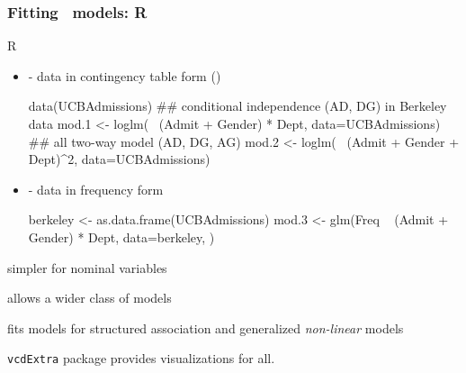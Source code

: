 \begin{frame}[fragile]
 \frametitle{Fitting \loglin\ models: R}
 \begin{block}{R}
  \begin{itemize}
   \item {} - data in contingency table form ()
\begin{Input}[baselinestretch=0.8,fontsize=\footnotesize]
data(UCBAdmissions)
  ## conditional independence (AD, DG) in Berkeley data
mod.1 <- loglm(~ (Admit + Gender) * Dept, data=UCBAdmissions)
  ## all two-way model (AD, DG, AG) 
mod.2 <- loglm(~ (Admit + Gender + Dept)^2, data=UCBAdmissions)
\end{Input}

   \item {} - data in frequency form
\begin{Input}[baselinestretch=0.8,fontsize=\footnotesize]
berkeley <- as.data.frame(UCBAdmissions)
mod.3 <- glm(Freq ~ (Admit + Gender) * Dept, data=berkeley, 
                   )
\end{Input}

  \end{itemize}
 \end{block}

\begin{itemize*}
  \item {} simpler for nominal variables
  \item {} allows a wider class of models
  \item {} fits models for structured association and
  generalized \emph{non-linear} models
  \item \texttt{vcdExtra} package provides visualizations for all.
  
\end{itemize*}

\end{frame}

